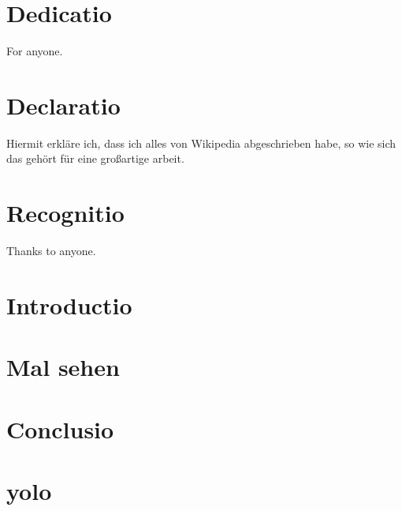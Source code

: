 \documentclass[12pt, twoside]{report} %
\begin{document}


\chapter*{Dedicatio}
For anyone.

\chapter*{Declaratio}
Hiermit erkläre ich, dass ich alles von Wikipedia abgeschrieben habe, so
wie sich das gehört für eine großartige arbeit.

\chapter*{Recognitio}
Thanks to anyone.

\tableofcontents

\chapter{Introductio}


\chapter{Mal sehen}


\chapter{Conclusio}


\appendix
\chapter{yolo}


\printbibliography
\end{document}
